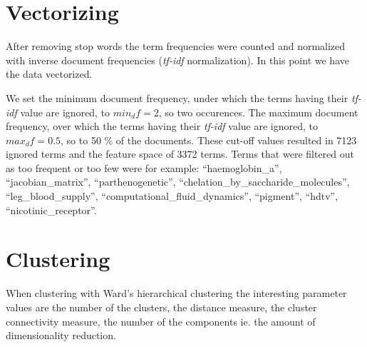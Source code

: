 \section{Vectorizing}
After removing stop words the term frequencies were counted and 
normalized with inverse document frequencies (\emph{tf-idf} 
normalization). 
In this point we have the data vectorized.

We set the minimum document frequency, under which the terms 
having their \emph{tf-idf} value are ignored, to $min_df=2$, so 
two occurences. The maximum document frequency, over which the 
terms having their \emph{tf-idf} value are ignored, to 
$max_df=0.5$, so to 50 \% of the documents.
These cut-off values resulted in 7123 ignored terms and the 
feature space of 3372 terms. Terms that were filtered out as too 
frequent or too few were for example: ``haemoglobin\_a'', 
``jacobian\_matrix'', 
``parthenogenetic'', ``chelation\_by\_saccharide\_molecules'', 
``leg\_blood\_supply'', ``computational\_fluid\_dynamics'', 
``pigment'', ``hdtv'', ``nicotinic\_receptor''.




\section{Clustering}
When clustering with Ward's hierarchical clustering the 
interesting parameter values are the number of the clusters, 
the distance measure, the cluster connectivity measure, the 
number of the components ie. the amount of dimensionality 
reduction.



